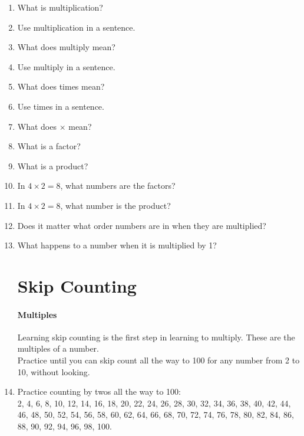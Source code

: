 \documentclass[12pt]{article}
\begin{document}
\begin{enumerate}

\item What is multiplication?
\item Use multiplication in a sentence.
\item What does multiply mean?
\item Use multiply in a sentence.
\item What does times mean?
\item Use times in a sentence.
\item What does $\times$ mean?
\item What is a factor?
\item What is a product?
\item In $4\times2=8$, what numbers are the factors?
\item In $4\times2=8$, what number is the product?
\item Does it matter what order numbers are in when they are multiplied?
\item What happens to a number when it is multiplied by 1?

\newpage

\section*{Skip Counting}
\paragraph{Multiples}
Learning skip counting is the first step in learning to multiply. These are the multiples of a number.\\

Practice until you can skip count all the way to 100 for any number from 2 to 10,  without looking.\\

\item Practice counting by twos all the way to 100:\\
2, 4, 6, 8, 10, 12, 14, 16, 18, 20, 22, 24, 26, 28, 30, 32, 34, 36, 38, 40, 42, 44, 46, 48, 50, 52, 54, 56, 58, 60, 62, 64, 66, 68, 70, 72, 74, 76, 78, 80, 82, 84, 86, 88, 90, 92, 94, 96, 98, 100.

\begin{center}
\end{center}


\end{enumerate}
\end{document}
